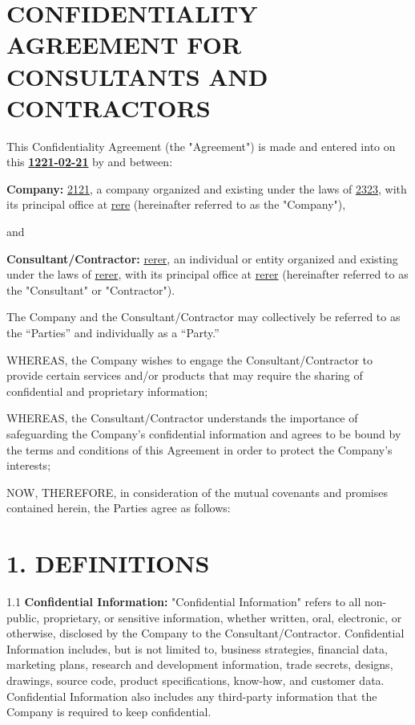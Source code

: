 \documentclass[12pt]{article}
\begin{document}
\section*{CONFIDENTIALITY AGREEMENT FOR CONSULTANTS AND CONTRACTORS}

This Confidentiality Agreement (the "Agreement") is made and entered into on this \textbf{\underline{1221-02-21}} by and between:

\textbf{Company:} \underline{2121}, a company organized and existing under the laws of \underline{2323}, with its principal office at \underline{rere} (hereinafter referred to as the "Company"),

and

\textbf{Consultant/Contractor:} \underline{rerer}, an individual or entity organized and existing under the laws of \underline{rerer}, with its principal office at \underline{rerer} (hereinafter referred to as the "Consultant" or "Contractor").

The Company and the Consultant/Contractor may collectively be referred to as the “Parties” and individually as a “Party.”

WHEREAS, the Company wishes to engage the Consultant/Contractor to provide certain services and/or products that may require the sharing of confidential and proprietary information;

WHEREAS, the Consultant/Contractor understands the importance of safeguarding the Company’s confidential information and agrees to be bound by the terms and conditions of this Agreement in order to protect the Company’s interests;

NOW, THEREFORE, in consideration of the mutual covenants and promises contained herein, the Parties agree as follows:

\section*{1. DEFINITIONS}

1.1 \textbf{Confidential Information:} "Confidential Information" refers to all non-public, proprietary, or sensitive information, whether written, oral, electronic, or otherwise, disclosed by the Company to the Consultant/Contractor. Confidential Information includes, but is not limited to, business strategies, financial data, marketing plans, research and development information, trade secrets, designs, drawings, source code, product specifications, know-how, and customer data. Confidential Information also includes any third-party information that the Company is required to keep confidential.
\end{document}
